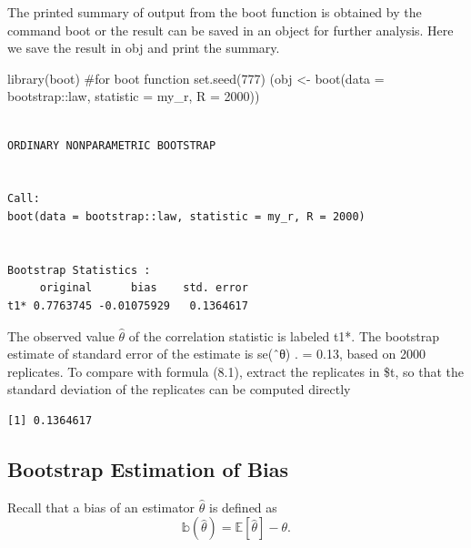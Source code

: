 \documentclass[
  letterpaper,
  DIV=11,
  numbers=noendperiod]{scrreprt}
\newenvironment{Shaded}{\begin{snugshade}}{\end{snugshade}}
\newcommand{\AttributeTok}[1]{\textcolor[rgb]{0.40,0.45,0.13}{#1}}
\newcommand{\CommentTok}[1]{\textcolor[rgb]{0.37,0.37,0.37}{#1}}
\newcommand{\DecValTok}[1]{\textcolor[rgb]{0.68,0.00,0.00}{#1}}
\newcommand{\FunctionTok}[1]{\textcolor[rgb]{0.28,0.35,0.67}{#1}}
\newcommand{\NormalTok}[1]{\textcolor[rgb]{0.00,0.23,0.31}{#1}}
\newcommand{\OtherTok}[1]{\textcolor[rgb]{0.00,0.23,0.31}{#1}}
\newcommand{\SpecialCharTok}[1]{\textcolor[rgb]{0.37,0.37,0.37}{#1}}
\begin{document}
The printed summary of output from the boot function is obtained by the
command boot or the result can be saved in an object for further
analysis. Here we save the result in obj and print the summary.

\begin{Shaded}
\begin{Highlighting}[]
\FunctionTok{library}\NormalTok{(boot) }\CommentTok{\#for boot function}
\FunctionTok{set.seed}\NormalTok{(}\DecValTok{777}\NormalTok{)}
\NormalTok{(obj }\OtherTok{\textless{}{-}} \FunctionTok{boot}\NormalTok{(}\AttributeTok{data =}\NormalTok{ bootstrap}\SpecialCharTok{::}\NormalTok{law, }\AttributeTok{statistic =}\NormalTok{ my\_r, }\AttributeTok{R =} \DecValTok{2000}\NormalTok{))}
\end{Highlighting}
\end{Shaded}

\begin{verbatim}

ORDINARY NONPARAMETRIC BOOTSTRAP


Call:
boot(data = bootstrap::law, statistic = my_r, R = 2000)


Bootstrap Statistics :
     original      bias    std. error
t1* 0.7763745 -0.01075929   0.1364617
\end{verbatim}

The observed value \(\hat \theta\) of the correlation statistic is
labeled t1*. The bootstrap estimate of standard error of the estimate is
se(ˆθ) . = 0.13, based on 2000 replicates. To compare with formula
(8.1), extract the replicates in \$t, so that the standard deviation of
the replicates can be computed directly

\begin{Shaded}
\end{Shaded}

\begin{verbatim}
[1] 0.1364617
\end{verbatim}

\subsection{Bootstrap Estimation of
Bias}\label{bootstrap-estimation-of-bias}

Recall that a bias of an estimator \(\hat \theta\) is defined as \[
\mathbb b(\hat \theta) = \mathbb E[\hat \theta] - \theta.
\]
\end{document}
